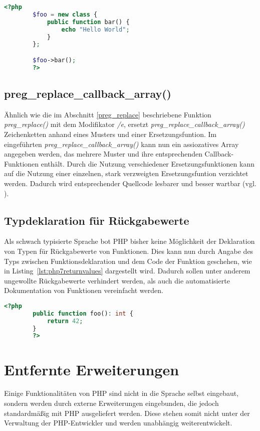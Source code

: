    \begin{lstlisting}[language=php, caption={Beispiel der Nutzung anonymer Klassen}, label={lst:php7anon_class}]
        <?php
        $foo = new class {
            public function bar() {
                echo "Hello World";
            }
        };

        $foo->bar();
        ?>
    \end{lstlisting}

    \subsection{preg\_replace\_callback\_array()}\label{preg_speed}
    Ähnlich wie die im Abschnitt \ref{preg_replace} beschriebene Funktion \textit{preg\_replace()} mit dem Modifikator \textit{/e}, ersetzt 
    \textit{preg\_replace\_callback\_array()} Zeichenketten anhand eines Musters und einer Ersetzungsfuntion. Im eingeführten \textit{preg\_replace\_callback\_array()} 
    kann nun ein assiozatives Array angegeben werden, das mehrere Muster und ihre entsprechenden Callback-Funktionen enthält. Durch die Nutzung verschiedener 
    Ersetzungsfunktionen kann auf die Nutzung einer einzelnen, stark verzweigten Ersetzungsfuntion verzichtet werden. Dadurch wird entsprechender Quellcode lesbarer 
    und besser wartbar (vgl. \cite[S. 34f]{martin_clean_2012}).

    \subsection{Typdeklaration für Rückgabewerte} %
    Als schwach typisierte Sprache bot \acs{PHP} bisher keine Möglichkeit der Deklaration von Typen für Rückgabewerte von Funktionen. Dies kann nun durch Angabe des
    Typs zwischen Funktionsdeklaration und dem Code der Funktion geschehen, wie in Listing~\ref{lst:php7returnvalues} dargestellt wird. Dadurch sollen unter anderem ungewollte Rückgabewerte verhindert werden, als auch die 
    automatisierte Dokumentation von Funktionen vereinfacht werden. \cite{morrison_php:_2014-1} 

    \begin{lstlisting}[language=php, caption={Typdeklaration für Rückgabewerte}, label={lst:php7returnvalues}]
        <?php
        public function foo(): int {
            return 42;
        }
        ?>
    \end{lstlisting}

\section{Entfernte Erweiterungen}
Einige Funktionalitäten von \acs{PHP} sind nicht in die Sprache selbst eingebaut, sondern werden durch externe Erweiterungen eingebunden, die jedoch standardmäßig
mit \acs{PHP} ausgeliefert werden. Diese stehen somit nicht unter der Verwaltung der \acs{PHP}-Entwickler und werden unabhängig weiterentwickelt.
